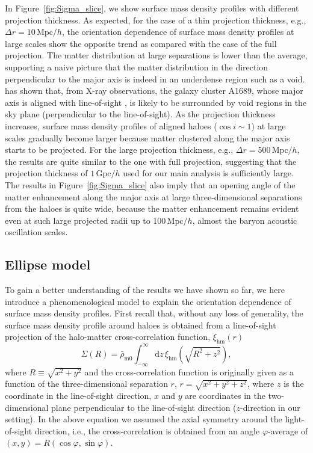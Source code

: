 \documentclass[a4paper,fleqn,usenatbib]{mnras}
\newcommand{\beq}{\begin{equation}}
\newcommand{\eeq}{\end{equation}}
\newcommand{\Mpc}{\mathrm{Mpc}}
\newcommand{\rmhm}{\mathrm{hm}}
\begin{document}
In Figure~\ref{fig:Sigma_slice}, we show surface mass density profiles
with different projection thickness.
As expected, for the case of a thin projection thickness, e.g.,
$\Delta r = 10\,\Mpc /h$, the orientation dependence of surface mass
density profiles at large scales show the opposite trend as compared
with the case of the full projection.
The matter distribution at large separations
is lower than the average, supporting a naive picture
that the matter distribution in the direction perpendicular to the major axis
is indeed in an underdense region such as a void.
\citet{Kawaharada2010} has shown that, from X-ray observations,
the galaxy cluster A1689, whose major axis
is aligned with line-of-sight \citep{Oguri2005,Umetsu2015},
is likely to be surrounded by void regions
in the sky plane (perpendicular to the line-of-sight).
As the projection thickness increases,
surface mass density profiles of aligned haloes ($\cos i \sim 1$)
at large scales gradually become larger because matter
clustered along the major axis starts to be projected.
For the large projection thickness, e.g., $\Delta r = 500\,\Mpc /h$,
the results are quite similar to the one with full projection,
suggesting that the projection thickness of $1\,\mathrm{Gpc}/h$ used
for our main analysis is sufficiently large.
The results in Figure~\ref{fig:Sigma_slice} also imply that
an opening angle of the matter enhancement
along the major axis at large three-dimensional
separations from the haloes is quite wide, because the matter enhancement
remains evident even at such large projected radii up to $100\,\Mpc/h$,
almost the baryon acoustic oscillation scales.

\subsection{Ellipse model}
To gain a better understanding of the results we have shown so far,
we here introduce a phenomenological model to explain the orientation
dependence of surface mass density profiles.
First recall that, without any loss of generality,
the surface mass density profile around
haloes is obtained from a line-of-sight projection of the halo-matter
cross-correlation function, $\xi_\rmhm (r)$ \citep{Mandelbaum2006,Miyatake2015}
\beq
\Sigma(R)=\bar{\rho}_{\mathrm{m0}}\int_{-\infty}^{\infty}\!\!\mathrm{d}z \,
\xi_\rmhm \left( \sqrt{R^2+z^2} \right) ,
\label{eq:sigma_def}
\eeq
where $R \equiv \sqrt{x^2+y^2}$ and the cross-correlation
function is originally given as a function of
the three-dimensional separation $r$,
$r = \sqrt{x^2+y^2+z^2}$, where $z$ is the coordinate in the line-of-sight direction,
$x$ and $y$ are coordinates in the two-dimensional
plane perpendicular to the line-of-sight direction ($z$-direction in our setting).
In the above equation we assumed the axial symmetry around the
light-of-sight direction, i.e., the cross-correlation is obtained from
an angle $\varphi$-average of $(x, y) = R (\cos \varphi, \sin \varphi)$.
\end{document}
